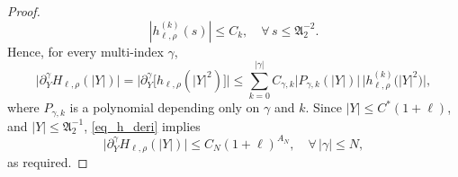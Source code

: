 \documentclass[12pt]{amsart}
\begin{document}
\begin{proof}
\begin{equation}\label{eq_h_deri}
    |h_{\ell,\rho}^{(k)}(s)|\le C_k, \quad \forall\, s\le \mathfrak A_2^{-2}.
\end{equation}
Hence, for every multi-index $\gamma$,
\begin{equation*}
    \bigl| \partial_Y^{\gamma} H_{\ell,\rho}(|Y|)\bigr|
    = \bigl|\partial_Y^\gamma
    \bigl[
        h_{\ell,\rho}(|Y|^2)
    \bigr]\bigr|
    \le \sum_{k=0}^{|\gamma|} C_{\gamma, k} \bigl|P_{\gamma,k}(|Y|)\bigr| \, \bigl|h_{\ell,\rho}^{(k)}\bigl(|Y|^2\bigr)\bigr|,
\end{equation*}
where $P_{\gamma,k}$ is a polynomial depending only on $\gamma$ and $k$. Since $|Y|\le C^*(1+\ell)$, and $|Y|\le \mathfrak A_2^{-1}$, \eqref{eq_h_deri} implies
\begin{equation*}
    \bigl|
        \partial_Y^\gamma H_{\ell,\rho}(|Y|)
    \bigr|
    \le
    C_N (1+\ell)^{A_N},\quad \forall\, |\gamma|\le N,
\end{equation*}
as required.


\end{proof}
\end{document}
